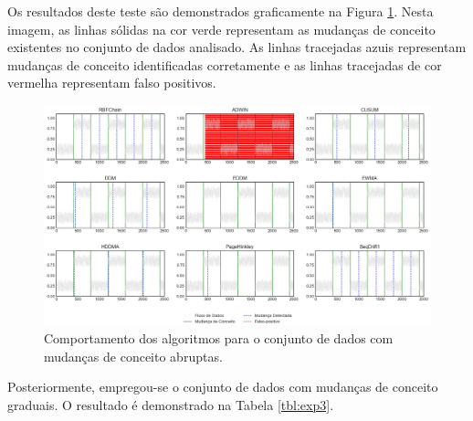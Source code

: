 \documentclass[msc, classic, a4paper]{ufbathesis}
\begin{document}
Os resultados deste teste são demonstrados graficamente na Figura \ref{fig:exp_abrupta}. Nesta imagem, as linhas sólidas na cor verde representam as mudanças de conceito existentes no conjunto de dados analisado. As linhas tracejadas azuis representam mudanças de conceito identificadas corretamente e as linhas tracejadas de cor vermelha representam falso positivos.

\begin{landscape}
\begin{figure}[h]
\begin{center}
    \includegraphics[scale=0.65]{imagens/abrupt.png}
    \caption{Comportamento dos algoritmos para o conjunto de dados com mudanças de conceito abruptas.}
    \label{fig:exp_abrupta}
\end{center}
\end{figure}
\end{landscape}

Posteriormente, empregou-se o conjunto de dados com mudanças de conceito graduais.
O resultado é demonstrado na Tabela \ref{tbl:exp3}.
\end{document}
